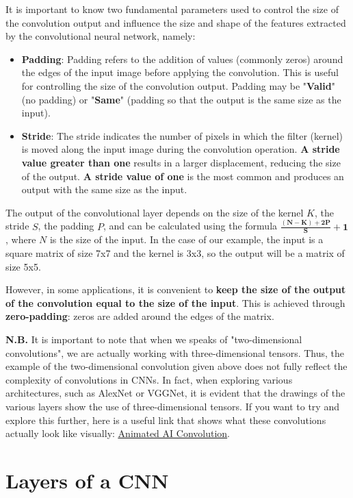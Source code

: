 It is important to know two fundamental parameters used to control the size of the convolution output and influence the size and shape of the features extracted by the convolutional neural network, namely:
\begin{itemize}
    \item \textbf{Padding}: Padding refers to the addition of values (commonly zeros) around the edges of the input image before applying the convolution. This is useful for controlling the size of the convolution output. Padding may be "\textbf{Valid}" (no padding) or "\textbf{Same}" (padding so that the output is the same size as the input).
    \item \textbf{Stride}: The stride indicates the number of pixels in which the filter (kernel) is moved along the input image during the convolution operation. \textbf{A stride value greater than one} results in a larger displacement, reducing the size of the output. \textbf{A stride value of one} is the most common and produces an output with the same size as the input.
\end{itemize}


The output of the convolutional layer depends on the size of the kernel $K$, the stride $S$, the padding $P$, and can be calculated using the formula $\mathbf{\frac{(N-K)+2P}{S}+1}$, where $N$ is the size of the input. In the case of our example, the input is a square matrix of size 7x7 and the kernel is 3x3, so the output will be a matrix of size 5x5.

However, in some applications, it is convenient to \textbf{keep the size of the output of the convolution equal to the size of the input}. This is achieved through \textbf{zero-padding}: zeros are added around the edges of the matrix.


\textbf{N.B.} It is important to note that when we speaks of "two-dimensional convolutions", we are actually working with three-dimensional tensors. Thus, the example of the two-dimensional convolution given above does not fully reflect the complexity of convolutions in CNNs. In fact, when exploring various architectures, such as AlexNet or VGGNet, it is evident that the drawings of the various layers show the use of three-dimensional tensors. If you want to try and explore this further, here is a useful link that shows what these convolutions actually look like visually: \underline{\href{https://animatedai.github.io/}{Animated AI Convolution}}.


\section{Layers of a CNN}

